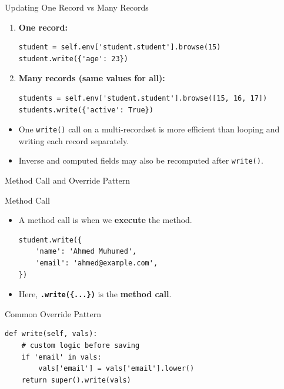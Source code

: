 \begin{frame}[fragile]{Updating One Record vs Many Records}
	\begin{enumerate}
		\item \textbf{One record:}
\begin{lstlisting}
student = self.env['student.student'].browse(15)
student.write({'age': 23})
\end{lstlisting}
		\item \textbf{Many records (same values for all):}
\begin{lstlisting}
students = self.env['student.student'].browse([15, 16, 17])
students.write({'active': True})
\end{lstlisting}
	\end{enumerate}
	\begin{itemize}
		\item One \texttt{write()} call on a multi-recordset is more efficient than looping and writing each record separately.
		\item Inverse and computed fields may also be recomputed after \texttt{write()}.
	\end{itemize}
\end{frame}

\begin{frame}[fragile]{Method Call and Override Pattern}
\begin{block}{Method Call}
	\begin{itemize}
		\item A method call is when we \textbf{execute} the method.
\begin{lstlisting}
student.write({
	'name': 'Ahmed Muhumed',
	'email': 'ahmed@example.com',
})
\end{lstlisting}
		\item Here, \textbf{\texttt{.write(\{...\})}} is the \textbf{method call}.
	\end{itemize}
\end{block}
\begin{block}{Common Override Pattern}
\begin{lstlisting}
def write(self, vals):
	# custom logic before saving
	if 'email' in vals:
		vals['email'] = vals['email'].lower()
	return super().write(vals)
\end{lstlisting}
\end{block}
\end{frame}
